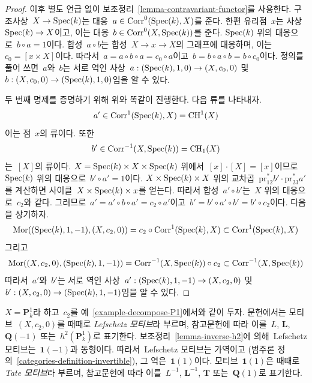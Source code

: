 \begin{proof}
이후 별도 언급 없이 보조정리\  \ref{lemma-contravariant-functor}를 사용한다.
구조사상\  $X \to \mathop{\mathrm{Spec}}(k)$는 대응\ 
$a \in \text{Corr}^0(\mathop{\mathrm{Spec}}(k), X)$를 준다. 한편 유리점\  $x$는 사상\ 
$\mathop{\mathrm{Spec}}(k) \to X$이고, 이는 대응\ 
$b \in \text{Corr}^0(X, \mathop{\mathrm{Spec}}(k))$를 준다. $\mathop{\mathrm{Spec}}(k)$ 위의 대응으로\ 
$b \circ a = 1$이다. 합성\  $a \circ b$는 합성\ 
$X \to x \to X$의 그래프에 대응하며, 이는\ 
$c_0 = [x \times X]$이다. 따라서\ 
$a = a \circ b \circ a = c_0 \circ a$이고\ 
$b = b \circ a \circ b = b \circ c_0$이다.
정의를 풀어 쓰면\  $a$와\  $b$는 서로 역인 사상\ 
$a : (\mathop{\mathrm{Spec}}(k), 1, 0) \to (X, c_0, 0)$ 및\ 
$b : (X, c_0, 0) \to (\mathop{\mathrm{Spec}}(k), 1, 0)$임을 알 수 있다.

\medskip\noindent
두 번째 명제를 증명하기 위해 위와 똑같이 진행한다. 다음 류를 나타내자.
$$
a' \in \text{Corr}^1(\mathop{\mathrm{Spec}}(k), X) = \mathop{\mathrm{CH}}\nolimits^1(X)
$$
이는 점\  $x$의 류이다. 또한
$$
b' \in \text{Corr}^{-1}(X, \mathop{\mathrm{Spec}}(k)) = \mathop{\mathrm{CH}}\nolimits_1(X)
$$
는\  $[X]$의 류이다. $X = \mathop{\mathrm{Spec}}(k) \times X \times \mathop{\mathrm{Spec}}(k)$ 위에서\ 
$[x] \cdot [X] = [x]$이므로\  $\mathop{\mathrm{Spec}}(k)$ 위의 대응으로\ 
$b' \circ a' = 1$이다. $X \times \mathop{\mathrm{Spec}}(k) \times X$ 위의 교차곱\ 
$\text{pr}_{12}^*b' \cdot \text{pr}_{23}^*a'$를 계산하면 사이클\ 
$X \times \mathop{\mathrm{Spec}}(k) \times x$를 얻는다. 따라서 합성\ 
$a' \circ b'$는\  $X$ 위의 대응으로\  $c_2$와 같다. 그러므로\ 
$a' = a' \circ b \circ a' = c_2 \circ a'$이고\ 
$b' = b' \circ a' \circ b' = b' \circ c_2$이다. 다음을 상기하자.
$$
\mathop{\mathrm{Mor}}\nolimits((\mathop{\mathrm{Spec}}(k), 1, -1), (X, c_2, 0)) =
c_2 \circ \text{Corr}^1(\mathop{\mathrm{Spec}}(k), X)
\subset
\text{Corr}^1(\mathop{\mathrm{Spec}}(k), X)
$$
그리고
$$
\mathop{\mathrm{Mor}}\nolimits((X, c_2, 0), (\mathop{\mathrm{Spec}}(k), 1, -1)) =
\text{Corr}^{-1}(X, \mathop{\mathrm{Spec}}(k)) \circ c_2
\subset
\text{Corr}^{-1}(X, \mathop{\mathrm{Spec}}(k))
$$
따라서\  $a'$와\  $b'$는 서로 역인 사상\ 
$a' : (\mathop{\mathrm{Spec}}(k), 1, -1) \to (X, c_2, 0)$ 및\ 
$b' : (X, c_2, 0) \to (\mathop{\mathrm{Spec}}(k), 1, -1)$임을 알 수 있다.
\end{proof}

\begin{remark}[Lefschetz와\  Tate 모티브]
\label{remark-lefschetz-tate}
$X = \mathbf{P}^1_k$라 하고\  $c_2$를 예\ 
\ref{example-decompose-P1}에서와 같이 두자. 문헌에서는 모티브\ 
$(X, c_2, 0)$를 때때로 {\it Lefschetz 모티브}라 부르며,
참고문헌에 따라 이를\  $L$, $\mathbf{L}$, $\mathbf{Q}(-1)$ 또는\ 
$h^2(\mathbf{P}^1_k)$로 표기한다. 보조정리\ 
\ref{lemma-inverse-h2}에 의해\  Lefschetz 모티브는\ 
$\mathbf{1}(-1)$과 동형이다. 따라서\  Lefschetz 모티브는 가역이고
(범주론 정의\  \ref{categories-definition-invertible}), 그 역은\ 
$\mathbf{1}(1)$이다. 모티브\  $\mathbf{1}(1)$은 때때로
{\it Tate 모티브}라 부르며, 참고문헌에 따라 이를\ 
$L^{-1}$, $\mathbf{L}^{-1}$, $\mathbf{T}$ 또는\  $\mathbf{Q}(1)$로
표기한다.
\end{remark}


